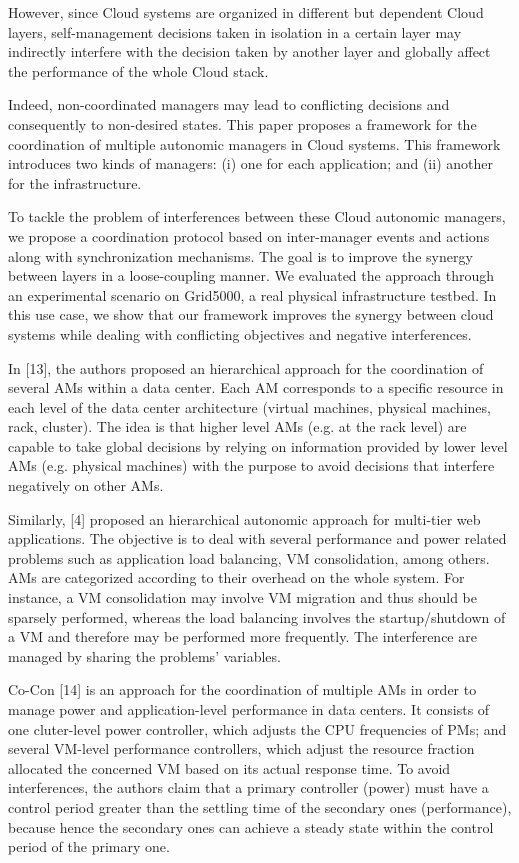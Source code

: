 However, since Cloud systems are organized in different but dependent Cloud layers, self-management decisions taken in isolation in a certain layer may indirectly interfere with the decision taken by another layer and globally affect the performance of the whole Cloud stack. 

Indeed, non-coordinated managers may lead to conflicting decisions and consequently to non-desired states. This paper proposes a framework for the coordination of multiple autonomic managers in Cloud systems. This framework introduces two kinds of managers: (i) one for each application; and (ii) another for the infrastructure. 

To tackle the problem of interferences between these Cloud autonomic managers, we propose a coordination protocol based on inter-manager events and actions along with synchronization mechanisms. The goal is to improve the synergy between layers in a loose-coupling manner. We evaluated the approach through an experimental scenario on Grid5000, a real physical infrastructure testbed. In this use case, we show that our framework improves the synergy between cloud systems while dealing with conflicting objectives and negative interferences.

In [13], the authors proposed an hierarchical approach for
the coordination of several AMs within a data center. Each
AM corresponds to a specific resource in each level of the
data center architecture (virtual machines, physical machines,
rack, cluster). The idea is that higher level AMs (e.g. at the
rack level) are capable to take global decisions by relying
on information provided by lower level AMs (e.g. physical
machines) with the purpose to avoid decisions that interfere
negatively on other AMs.

Similarly, [4] proposed an hierarchical autonomic approach
for multi-tier web applications. The objective is to deal with
several performance and power related problems such as
application load balancing, VM consolidation, among others.
AMs are categorized according to their overhead on the whole
system. For instance, a VM consolidation may involve VM
migration and thus should be sparsely performed, whereas the
load balancing involves the startup/shutdown of a VM and
therefore may be performed more frequently. The interference are managed by sharing the problems’ variables.

Co-Con [14] is an approach for the coordination of multiple AMs in order to manage power and application-level performance in data centers. It consists of one cluter-level power controller, which adjusts the CPU frequencies of PMs; and several VM-level performance controllers, which adjust the resource fraction allocated the concerned VM based on its actual response time. To avoid interferences, the authors claim that a primary controller (power) must have a control period greater than the settling time of the secondary ones (performance), because hence the secondary ones can achieve a steady state within the control period of the primary one.

